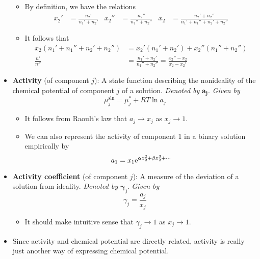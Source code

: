 \documentclass[../notes.tex]{subfiles}
\begin{document}
\begin{itemize}
\begin{itemize}
        \item By definition, we have the relations
        \begin{align*}
            x_2' &= \frac{n_2'}{n_1'+n_2'}&
            x_2'' &= \frac{n_2''}{n_1''+n_2''}&
            x_2 &= \frac{n_2'+n_2''}{n_1'+n_1''+n_2'+n_2''}
        \end{align*}
        \item It follows that
        \begin{align*}
            x_2(n_1'+n_1''+n_2'+n_2'') &= x_2'(n_1'+n_2')+x_2''(n_1''+n_2'')\\
            \frac{n'}{n''} &= \frac{n_1'+n_2'}{n_1''+n_2''} = \frac{x_2''-x_2}{x_2-x_2'}
        \end{align*}
    \end{itemize}
    \item \textbf{Activity} (of component $j$): A state function describing the nonideality of the chemical potential of component $j$ of a solution. \emph{Denoted by} $\bm{a_j}$. \emph{Given by}
    \begin{equation*}
        \mu_j^\text{sln} = \mu_j^*+RT\ln a_j
    \end{equation*}
    \begin{itemize}
        \item It follows from Raoult's law that $a_j\to x_j$ as $x_j\to 1$.
        \item We can also represent the activity of component 1 in a binary solution empirically by
        \begin{equation*}
            a_1 = x_1\e[\alpha x_2^2+\beta x_2^3+\cdots]
        \end{equation*}
    \end{itemize}
    \item \textbf{Activity coefficient} (of component $j$): A measure of the deviation of a solution from ideality. \emph{Denoted by} $\bm{\gamma_j}$. \emph{Given by}
    \begin{equation*}
        \gamma_j = \frac{a_j}{x_j}
    \end{equation*}
    \begin{itemize}
        \item It should make intuitive sense that $\gamma_j\to 1$ as $x_j\to 1$.
    \end{itemize}
    \item Since activity and chemical potential are directly related, activity is really just another way of expressing chemical potential.
    \begin{itemize}

\end{itemize}
\end{itemize}
\end{document}

